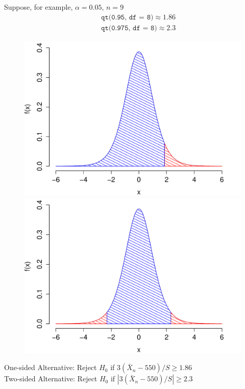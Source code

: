 \documentclass[handout]{beamer}
\begin{document}
\begin{frame}
Suppose, for example, $\alpha = 0.05$, $n = 9$
	\begin{eqnarray*}
		&&\texttt{qt(0.95, df  = 8)}\approx 1.86\\
		 &&\texttt{qt(0.975, df  = 8)}\approx 2.3
	\end{eqnarray*}
\begin{figure}
\includegraphics[scale = 0.3]{./images/one_side}
\includegraphics[scale = 0.3]{./images/two_side}
\end{figure}
One-sided Alternative: Reject $H_0$ if $3(\bar{X}_n - 550)/S \geq 1.86$\\
\vspace{0.5em}
Two-sided Alternative: Reject $H_0$ if $\left|3(\bar{X}_n - 550)/S\right| \geq 2.3$\\

\end{frame}
\end{document}
